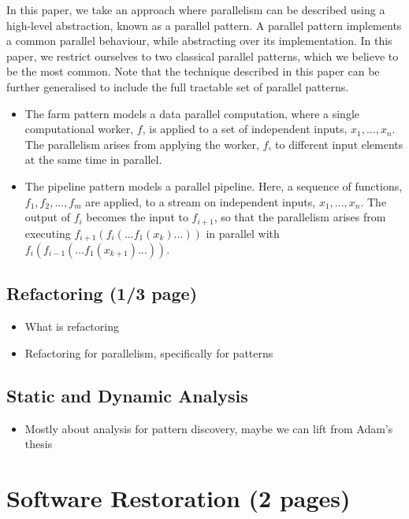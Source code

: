 \documentclass{llncs}
\begin{document}
In this paper, we take an approach where parallelism can be described using a high-level abstraction, known as a parallel pattern. A parallel pattern implements a common parallel behaviour, while abstracting over its implementation. 
In this paper, we restrict ourselves to two classical parallel patterns, which we believe to be the most common. Note that the technique described in this paper can be further generalised to include the full tractable set of parallel patterns.
\begin{itemize}
    \item The farm pattern models a data parallel computation, where a single computational worker, $f$, is applied to a set of independent inputs, $x_{1}, ..., x_{n}$. The parallelism arises from applying the worker, $f$, to different input elements at the same time in parallel. 
    \item The pipeline pattern models a parallel pipeline. Here, a sequence of functions, $f_{1}, f_{2}, ..., f_{m}$ are applied, to a stream on independent inputs, $x_{1}, ..., x_{n}$. The output of $f_{i}$ becomes the input to $f_{i+1}$, so that the parallelism arises from executing $f_{i+1}(f_{i}(...f_{1}(x_{k})...))$ in parallel with $f_{i}(f_{i-1}(...f_{1}(x_{k+1})...))$.
\end{itemize}
\subsection{Refactoring (1/3 page)}
\begin{itemize}
\item What is refactoring
\item Refactoring for parallelism, specifically for patterns
\end{itemize}

\subsection{Static and Dynamic Analysis}
\begin{itemize}
\item Mostly about analysis for pattern discovery, maybe we can lift from Adam's thesis
\end{itemize}


\section{Software Restoration (2 pages)} \label{sec:softRest}
\end{document}
